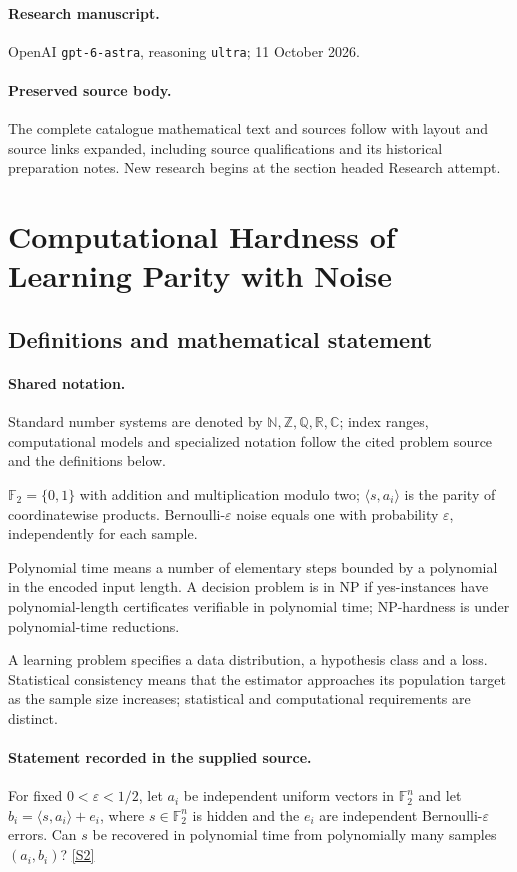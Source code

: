 \documentclass[11pt]{article}
\begin{document}
\paragraph{Research manuscript.} OpenAI \texttt{gpt-6-astra}, reasoning \texttt{ultra}; 11 October 2026.
\paragraph{Preserved source body.} The complete catalogue mathematical text and sources follow with layout and source links expanded, including source qualifications and its historical preparation notes. New research begins at the section headed Research attempt.

\section{Computational Hardness of Learning Parity with Noise}\label{statement}

\subsection{Definitions and mathematical statement}

\paragraph{Shared notation.}Standard number systems are denoted by $\mathbb N,\mathbb Z,\mathbb Q,\mathbb R,\mathbb C$; index ranges, computational models and specialized notation follow the cited problem source and the definitions below.


$\mathbb F_2=\{0,1\}$ with addition and multiplication modulo two; $\langle s,a_i\rangle$ is the parity of coordinatewise products. Bernoulli-$\varepsilon$ noise equals one with probability $\varepsilon$, independently for each sample.

Polynomial time means a number of elementary steps bounded by a polynomial in the encoded input length. A decision problem is in $\mathrm{NP}$ if yes-instances have polynomial-length certificates verifiable in polynomial time; NP-hardness is under polynomial-time reductions.

A learning problem specifies a data distribution, a hypothesis class and a loss. Statistical consistency means that the estimator approaches its population target as the sample size increases; statistical and computational requirements are distinct.
\paragraph{Statement recorded in the supplied source.}
For fixed $0<\varepsilon<1/2$, let $a_i$ be independent uniform vectors in $\mathbb F_2^n$ and let $b_i=\langle s,a_i\rangle+e_i$, where $s\in\mathbb F_2^n$ is hidden and the $e_i$ are independent Bernoulli-$\varepsilon$ errors. Can $s$ be recovered in polynomial time from polynomially many samples $(a_i,b_i)$? \href{https://doi.org/10.4171/owr/2005/26}{[S2]}
\end{document}
